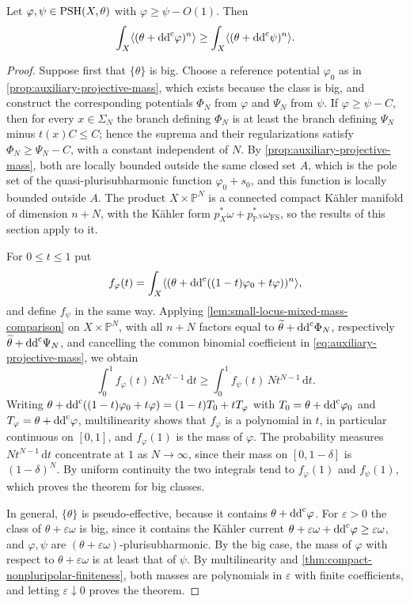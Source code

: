 \begin{theorem}\label{thm:nonpluripolar-self-mass-monotonicity}
Let $\varphi,\psi\in\mathrm{PSH}(X,\theta)$ with $\varphi\geq\psi-O(1)$. Then
\[
 \int_X\langle(\theta+\mathrm{dd}^{\mathrm{c}}\varphi)^n\rangle
       \geq\int_X\langle(\theta+\mathrm{dd}^{\mathrm{c}}\psi)^n\rangle.
\]
\end{theorem}
\begin{proof}
Suppose first that $\{\theta\}$ is big. Choose a reference potential $\varphi_0$ as in \cref{prop:auxiliary-projective-mass}, which exists because the class is big, and construct the corresponding potentials $\Phi_N$ from $\varphi$ and $\Psi_N$ from $\psi$. If $\varphi\geq\psi-C$, then for every $x\in\Sigma_N$ the branch defining $\Phi_N$ is at least the branch defining $\Psi_N$ minus $t(x)C\leq C$; hence the suprema and their regularizations satisfy $\Phi_N\geq\Psi_N-C$, with a constant independent of $N$. By \cref{prop:auxiliary-projective-mass}, both are locally bounded outside the same closed set $A$, which is the pole set of the quasi-plurisubharmonic function $\varphi_0+s_0$, and this function is locally bounded outside $A$. The product $X\times\mathbb P^N$ is a connected compact K\"ahler manifold of dimension $n+N$, with the K\"ahler form $p_X^*\omega+p_{\mathbb P^N}^*\omega_{\mathrm{FS}}$, so the results of this section apply to it.

For $0\leq t\leq1$ put
\[
 f_\varphi(t)=\int_X\langle(\theta+\mathrm{dd}^{\mathrm{c}}((1-t)\varphi_0+t\varphi))^n\rangle,
\]
and define $f_\psi$ in the same way. Applying \cref{lem:small-locus-mixed-mass-comparison} on $X\times\mathbb P^N$, with all $n+N$ factors equal to $\widetilde\theta+\mathrm{dd}^{\mathrm{c}}\Phi_N$, respectively $\widetilde\theta+\mathrm{dd}^{\mathrm{c}}\Psi_N$, and cancelling the common binomial coefficient in \eqref{eq:auxiliary-projective-mass}, we obtain
\[
 \int_0^1f_\varphi(t)\,Nt^{N-1}\,\mathrm dt\geq\int_0^1f_\psi(t)\,Nt^{N-1}\,\mathrm dt.
\]
Writing $\theta+\mathrm{dd}^{\mathrm{c}}((1-t)\varphi_0+t\varphi)=(1-t)T_0+tT_\varphi$ with $T_0=\theta+\mathrm{dd}^{\mathrm{c}}\varphi_0$ and $T_\varphi=\theta+\mathrm{dd}^{\mathrm{c}}\varphi$, multilinearity shows that $f_\varphi$ is a polynomial in $t$, in particular continuous on $[0,1]$, and $f_\varphi(1)$ is the mass of $\varphi$. The probability measures $Nt^{N-1}\,\mathrm dt$ concentrate at $1$ as $N\to\infty$, since their mass on $[0,1-\delta]$ is $(1-\delta)^N$. By uniform continuity the two integrals tend to $f_\varphi(1)$ and $f_\psi(1)$, which proves the theorem for big classes.

In general, $\{\theta\}$ is pseudo-effective, because it contains $\theta+\mathrm{dd}^{\mathrm{c}}\varphi$. For $\varepsilon>0$ the class of $\theta+\varepsilon\omega$ is big, since it contains the K\"ahler current $\theta+\varepsilon\omega+\mathrm{dd}^{\mathrm{c}}\varphi\geq\varepsilon\omega$, and $\varphi,\psi$ are $(\theta+\varepsilon\omega)$-plurisubharmonic. By the big case, the mass of $\varphi$ with respect to $\theta+\varepsilon\omega$ is at least that of $\psi$. By multilinearity and \cref{thm:compact-nonpluripolar-finiteness}, both masses are polynomials in $\varepsilon$ with finite coefficients, and letting $\varepsilon\downarrow0$ proves the theorem.
\end{proof}

